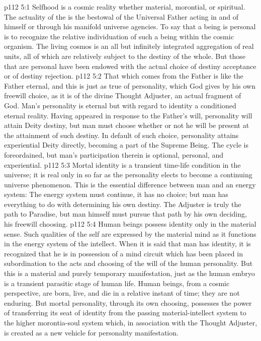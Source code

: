 \vs p112 5:1 Selfhood is a cosmic reality whether material, morontial, or spiritual. The actuality of the  is the bestowal of the Universal Father acting in and of himself or through his manifold universe agencies. To say that a being is personal is to recognize the relative individuation of such a being within the cosmic organism. The living cosmos is an all but infinitely integrated aggregation of real units, all of which are relatively subject to the destiny of the whole. But those that are personal have been endowed with the actual choice of destiny acceptance or of destiny rejection.
\vs p112 5:2 That which comes from the Father is like the Father eternal, and this is just as true of personality, which God gives by his own freewill choice, as it is of the divine Thought Adjuster, an actual fragment of God. Man’s personality is eternal but with regard to identity a conditioned eternal reality. Having appeared in response to the Father’s will, personality will attain Deity destiny, but man must choose whether or not he will be present at the attainment of such destiny. In default of such choice, personality attains experiential Deity directly, becoming a part of the Supreme Being. The cycle is foreordained, but man’s participation therein is optional, personal, and experiential.
\vs p112 5:3 \pc Mortal identity is a transient time\hyp{}life condition in the universe; it is real only in so far as the personality elects to become a continuing universe phenomenon. This is the essential difference between man and an energy system: The energy system must continue, it has no choice; but man has everything to do with determining his own destiny. The Adjuster is truly the path to Paradise, but man himself must pursue that path by his own deciding, his freewill choosing.
\vs p112 5:4 Human beings possess identity only in the material sense. Such qualities of the self are expressed by the material mind as it functions in the energy system of the intellect. When it is said that man has identity, it is recognized that he is in possession of a mind circuit which has been placed in subordination to the acts and choosing of the will of the human personality. But this is a material and purely temporary manifestation, just as the human embryo is a transient parasitic stage of human life. Human beings, from a cosmic perspective, are born, live, and die in a relative instant of time; they are not enduring. But mortal personality, through its own choosing, possesses the power of transferring its seat of identity from the passing material\hyp{}intellect system to the higher morontia\hyp{}soul system which, in association with the Thought Adjuster, is created as a new vehicle for personality manifestation.
